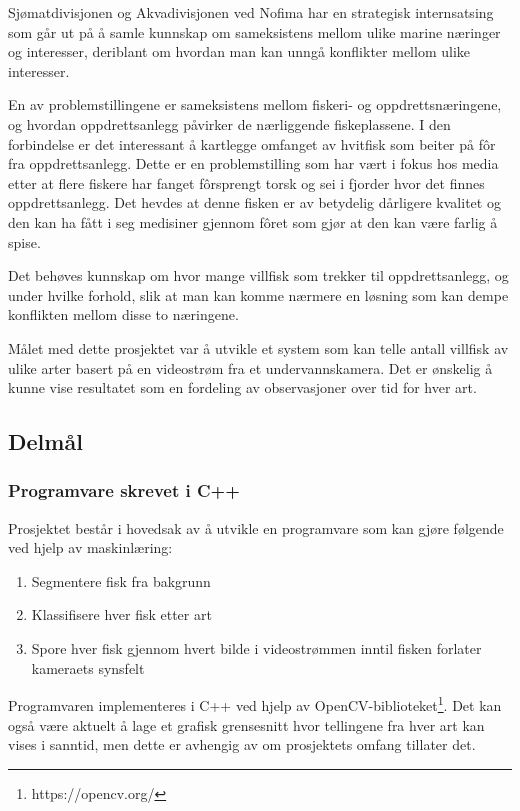 
Sjømatdivisjonen og Akvadivisjonen ved Nofima har en strategisk internsatsing som går ut på å samle kunnskap om sameksistens mellom ulike marine næringer og interesser, deriblant om hvordan man kan unngå konflikter mellom ulike interesser. \cite{Robertsen 2020}

En av problemstillingene er sameksistens mellom fiskeri- og oppdrettsnæringene, og hvordan oppdrettsanlegg påvirker de nærliggende fiskeplassene. I den forbindelse er det interessant å kartlegge omfanget av hvitfisk som beiter på fôr fra oppdrettsanlegg. Dette er en problemstilling som har vært i fokus hos media etter at flere fiskere har fanget fôrsprengt torsk og sei i fjorder hvor det finnes oppdrettsanlegg. Det hevdes at denne fisken er av betydelig dårligere kvalitet og den kan ha fått i seg medisiner gjennom fôret som gjør at den kan være farlig å spise. \cite{Olsen 2019}

Det behøves kunnskap om hvor mange villfisk som trekker til oppdrettsanlegg, og under hvilke forhold, slik at man kan komme nærmere en løsning som kan dempe konflikten mellom disse to næringene. 

Målet med dette prosjektet var å utvikle et system som kan telle antall villfisk av ulike arter basert på en videostrøm fra et undervannskamera. Det er ønskelig å kunne vise resultatet som en fordeling av observasjoner over tid for hver art. 

\subsection{Delmål}

\subsubsection{Programvare skrevet i C++}

Prosjektet består i hovedsak av å utvikle en programvare som kan gjøre følgende ved hjelp av maskinlæring: 

\begin{enumerate}
\item Segmentere fisk fra bakgrunn
\item Klassifisere hver fisk etter art
\item Spore hver fisk gjennom hvert bilde i videostrømmen inntil fisken forlater kameraets synsfelt
\end{enumerate}

Programvaren implementeres i C++ ved hjelp av OpenCV-biblioteket\footnote{https://opencv.org/}. Det kan også være aktuelt å lage et grafisk grensesnitt hvor tellingene fra hver art kan vises i sanntid, men dette er avhengig av om prosjektets omfang tillater det. 